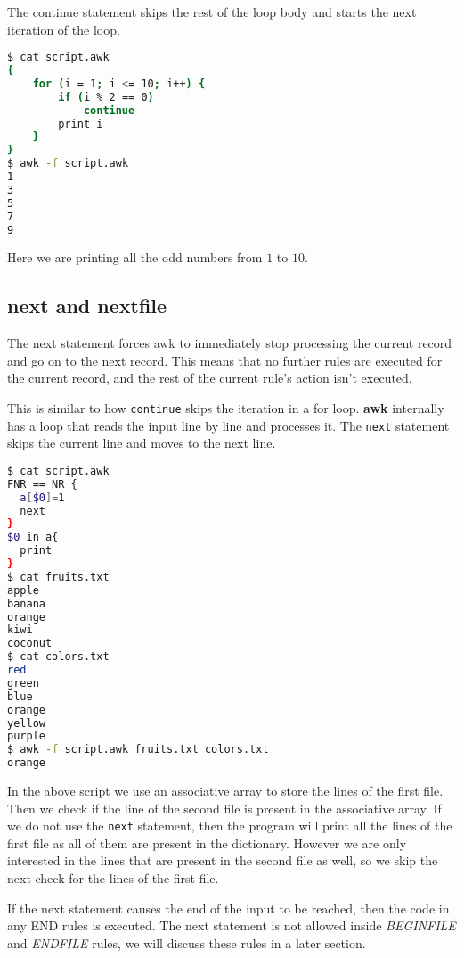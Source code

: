The continue statement skips the rest of the loop body and starts the next iteration of the loop.

\begin{lstlisting}[language=bash]
$ cat script.awk
{
    for (i = 1; i <= 10; i++) {
        if (i % 2 == 0)
            continue
        print i
    }
}
$ awk -f script.awk
1
3
5
7
9
\end{lstlisting}

Here we are printing all the odd numbers from $1$ to $10$.

\subsection{next and nextfile}

\begin{definition}[next]
  The next statement forces awk to immediately stop processing the current record and go on to the next record.
  This means that no further rules are executed for the current record, and the rest of the current rule's action isn't executed.
\end{definition}

This is similar to how \lstinline|continue| skips the iteration in a for loop.
\textbf{awk} internally has a loop that reads the input line by line and processes it.
The \lstinline|next| statement skips the current line and moves to the next line.

\begin{lstlisting}[language=bash]
$ cat script.awk
FNR == NR {
  a[$0]=1
  next
}
$0 in a{
  print
}
$ cat fruits.txt
apple
banana
orange
kiwi
coconut
$ cat colors.txt
red
green
blue
orange
yellow
purple
$ awk -f script.awk fruits.txt colors.txt
orange
\end{lstlisting}

In the above script we use an associative array to store the lines of the first file.
Then we check if the line of the second file is present in the associative array.
If we do not use the \lstinline|next| statement, then the program will print all the lines of the first file as all of them are present in the dictionary.
However we are only interested in the lines that are present in the second file as well, so we skip the next check for the lines of the first file.

If the next statement causes the end of the input to be reached, then the code in any END rules is executed. 
The next statement is not allowed inside \textit{BEGINFILE} and \textit{ENDFILE} rules, we will discuss these rules in a later section.

